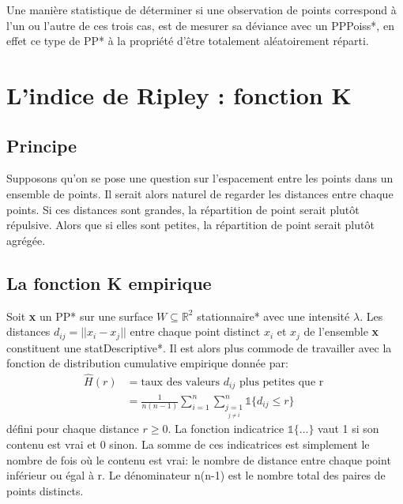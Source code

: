 \documentclass[stage2a]{tnreport}
\begin{document}
Une manière statistique de déterminer si une observation de points correspond à l'un ou l'autre de ces trois cas, est de mesurer sa déviance avec un \gls{PPPoiss}*, en effet ce type de \gls{PP}* à la propriété d'être totalement aléatoirement réparti.


\section{L'indice de Ripley : fonction K}

\subsection{Principe}
Supposons qu'on se pose une question sur l'espacement entre les points dans un ensemble de points. Il serait alors naturel de regarder les distances entre chaque points. Si ces distances sont grandes, la répartition de point serait plutôt répulsive. Alors que si elles sont petites, la répartition de point serait plutôt agrégée.

\subsection{La fonction K empirique}
Soit \textbf{x} un \gls{PP}* sur une surface \begin{math} W \subseteq \mathbb{R}^2\end{math} \gls{stationnaire}* avec une intensité \begin{math}\lambda\end{math}. Les distances \begin{math} d_{ij} = ||x_i-x_j||\end{math} entre chaque point distinct \begin{math} x_i \end{math} et \begin{math} x_j \end{math} de l'ensemble \textbf{x} constituent une \gls{statDescriptive}*. Il est alors plus commode de travailler avec la fonction de distribution cumulative empirique donnée par:
\begin{align*}
\hat{H}(r) &= \text{taux des valeurs } d_{ij} \text{ plus petites que r } \\
        &= \frac{1}{n(n-1)} \sum_{i=1}^n \sum_{\underset{j \neq i}{j=1}}^n \mathds{1} \{d_{ij} \leq r \}
\end{align*}
défini pour chaque distance \begin{math} r \geq 0 \end{math}. La fonction indicatrice  \begin{math} \mathds{1} \{...\}\end{math} vaut 1 si son contenu est vrai et 0 sinon. La somme de ces indicatrices est simplement le nombre de fois où le contenu est vrai: le nombre de distance entre chaque point inférieur ou égal à r. Le dénominateur n(n-1) est le nombre total des paires de points distincts.
\end{document}

